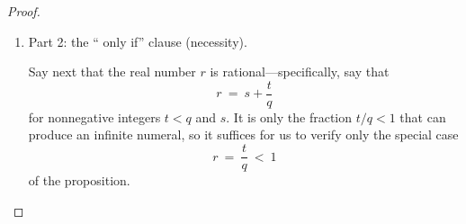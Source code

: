 \begin{proof}
\begin{enumerate}
We learned in Section~\ref{sec:geometric-sums} that infinite summations such as
$\sum_{i=1}^\infty b^{-2-3i}$ in (\ref{eq:sum-in-numeral}) {\em converge}---meaning that {\em they have finite rational sums}---and we learned how to compute these sums.  For the purposes of the current proof, we just accept this fact, and we denote the summation's finite rational sum by $p/q$.

\medskip

Collecting all of this information, we find that there exist {\em integers} $m$, $n$, $p$, and $q$ such that
\[ r \ = \ m \ + \ n/ b^{2} \ + \ p/q \ = \
\frac{mqb^2 + nq + pb^2}{qb^2}. \]
The number $r$ is, thus, the ratio of two integers; hence, by definition, it is rational.

\medskip\item 
{\small\sf Part 2: the `` only if'' clause (necessity).}

\smallskip

Say next that the real number $r$ is rational---specifically, say that
\[ r \ = \ s + \frac{t}{q} \]
for nonnegative integers $t < q$ and $s$.  It is only the fraction $t/q < 1$ that can produce an infinite numeral, so it suffices for us to verify only the special case
\[ r \ = \ \frac{t}{q} \ < \ 1 \]
of the proposition.

\smallskip



\end{enumerate}
\end{proof}

